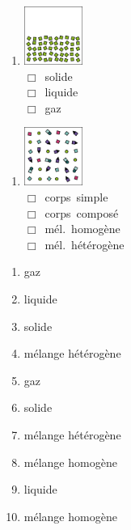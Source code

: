 \documentclass[
  11pt,
  a4paper,
  openany]{book}
\providecommand{\tightlist}{%
  \setlength{\itemsep}{0pt}\setlength{\parskip}{0pt}}
\begin{document}
\begin{Exercise}
\begin{multicols}{3}
\columnbreak

\begin{enumerate}
\def\labelenumi{\roman{enumi}.}
\tightlist
\item
  \includegraphics[width=0.15\textwidth,height=\textheight]{images/melanges-corps-purs-60-i.png}\\
  \(\Box\)~solide\\
  \(\Box\)~liquide\\
  \(\Box\)~gaz
\end{enumerate}

\begin{enumerate}
\def\labelenumi{\alph{enumi}.}
\setcounter{enumi}{9}
\tightlist
\item
  \includegraphics[width=0.15\textwidth,height=\textheight]{images/melanges-corps-purs-60-j.png}\\
  \(\Box\)~corps~simple\\
  \(\Box\)~corps~composé\\
  \(\Box\)~mél.~homogène\\
  \(\Box\)~mél.~hétérogène
\end{enumerate}

\end{multicols}

\end{Exercise}

\begin{Answer}

\begin{enumerate}
\def\labelenumi{\alph{enumi}.}
\tightlist
\item
  gaz
\item
  liquide
\item
  solide
\item
  mélange hétérogène
\item
  gaz
\item
  solide
\item
  mélange hétérogène
\item
  mélange homogène
\item
  liquide
\item
  mélange homogène
\end{enumerate}

\end{Answer}
\end{document}
